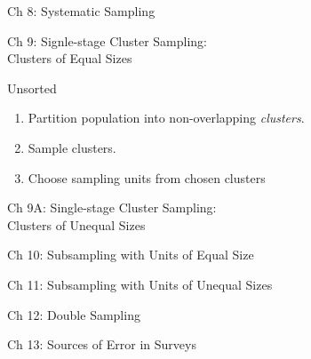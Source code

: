 \documentclass{article}
\begin{document}
\begin{section}{Ch 8: Systematic Sampling}
\end{section}

\begin{section}{Ch 9: Signle-stage Cluster Sampling:\\Clusters of Equal Sizes}
\begin{subsection}{Unsorted}
\begin{enumerate}
\item Partition population into non-overlapping \emph{clusters}.
\item Sample clusters.
\item Choose sampling units from chosen clusters
\end{enumerate}
\end{subsection}
\end{section}

\begin{section}{Ch 9A: Single-stage Cluster Sampling:\\Clusters of Unequal Sizes}
\end{section}

\begin{section}{Ch 10: Subsampling with Units of Equal Size}
\end{section}

\begin{section}{Ch 11: Subsampling with Units of Unequal Sizes}
\end{section}

\begin{section}{Ch 12: Double Sampling}
\end{section}

\begin{section}{Ch 13: Sources of Error in Surveys}
\end{section}
\end{document}
